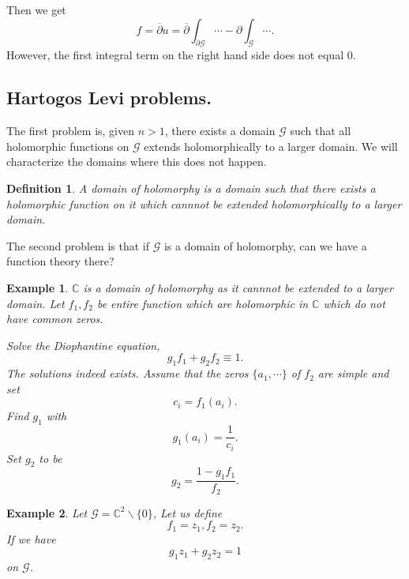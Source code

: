 \documentclass{article}
\newtheorem{definition}{Definition}[section]
\newtheorem{example}{Example}[section]
\newcommand{\C}[0]{\mathbb{C}}
\newcommand{\G}[0]{\mathcal{G}}
\newcommand{\bd}[0]{\partial}
\newcommand{\nonzero}[0]{\backslash\{0\}}
\begin{document}
Then we get 
\begin{equation*}
  f = \overline{\partial} u = \overline{\partial}\int_{\bd\G}\cdots-\partial\int_\G\cdots.
\end{equation*}
However, the first integral term on the right hand side does not equal $0$. 

\subsection{Hartogos Levi problems.}

The first problem is, given $n>1$, there exists a domain $\G$ such that all holomorphic functions on $\G$ extends holomorphically to a larger domain.
We will characterize the domains where this does not happen. 
\begin{definition}
  A domain of holomorphy is a domain such that there exists a holomorphic function on it which cannnot be extended holomorphically to a larger domain.
\end{definition}

The second problem is that if $\G$ is a domain of holomorphy, can we have a function theory there?

\begin{example}
  $\C$ is a domain of holomorphy as it cannnot be extended to a larger domain. Let $f_1,f_2$ be entire function which are holomorphic in $\C$ which do not have common zeros.
  \par Solve the Diophantine equation,
  \begin{equation*}
    g_1f_1 +g_2f_2 \equiv 1. 
  \end{equation*} 
  The solutions indeed exists. Assume that the zeros $\{a_1,\cdots\}$ of $f_2$ are simple and set 
  \begin{equation*}
    c_i = f_1(a_i).
  \end{equation*}
  Find $g_1$ with 
  \begin{equation*}
    g_1(a_i) = {\frac 1 {c_i}}.
  \end{equation*}
  Set $g_2$ to be 
  \begin{equation*}
    g_2 = {\frac {1 - g_1f_1} {f_2}}.
  \end{equation*}
\end{example}

\begin{example}
  Let $\G=\C^2\nonzero$, Let us define 
  \begin{equation*}
    f_1 = z_1, f_2 = z_2. 
  \end{equation*}
  If we have 
  \begin{equation*}
    g_1z_1+g_2z_2 = 1
  \end{equation*}
  on $\G$.
\end{example}
\end{document}
